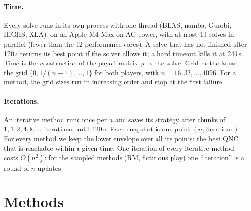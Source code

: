 \documentclass[10pt,a4paper]{article}
\begin{document}
\paragraph{Time.} Every solve runs in its own process with one thread (BLAS, numba, Gurobi, HiGHS,
XLA), on an Apple M4 Max on AC power, with at most 10 solves in parallel (fewer than the 12
performance cores). A solve that has not finished after 120\,s returns its best point if the
solver allows it; a hard timeout kills it at 240\,s. Time is the construction of the payoff
matrix plus the solve. Grid methods use the grid $\{0, 1/(n-1), \dots, 1\}$ for both players,
with $n=16,32,\dots,4096$. For a method, the grid sizes run in increasing order and stop at the
first failure.

\paragraph{Iterations.} An iterative method runs once per $n$ and saves its strategy after
chunks of $1,1,2,4,8,\dots$ iterations, until 120\,s. Each snapshot is one point
$(n,\text{iterations})$. For every method we keep the lower envelope over all its points: the best
QNC that is reachable within a given time. One iteration of every iterative method costs $O(n^2)$:
for the sampled methods (RM, fictitious play) one ``iteration'' is a round of $n$ updates.

\section{Methods}
\end{document}
